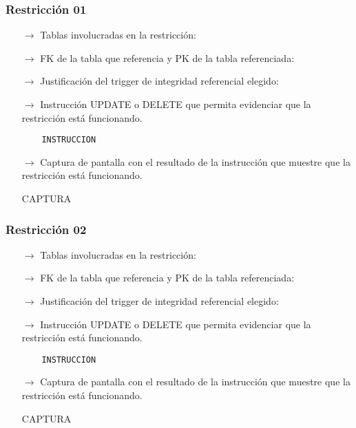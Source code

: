 \subsubsection*{Restricción 01}

\begin{itemize}
    \item[$\rightarrow$] Tablas involucradas en la restricción: 
    \item[$\rightarrow$] FK de la tabla que referencia y PK de la tabla referenciada: 
    \item[$\rightarrow$] Justificación del trigger de integridad referencial elegido: 
    \item[$\rightarrow$] Instrucción UPDATE o DELETE que permita evidenciar que la restricción está
    funcionando.
    \begin{verbatim}
    INSTRUCCION
    \end{verbatim}
    \item[$\rightarrow$] Captura de pantalla con el resultado de la instrucción que muestre que la restricción está
    funcionando.
    \begin{center}
        CAPTURA
    \end{center}
\end{itemize}

\subsubsection*{Restricción 02}

\begin{itemize}
    \item[$\rightarrow$] Tablas involucradas en la restricción: 
    \item[$\rightarrow$] FK de la tabla que referencia y PK de la tabla referenciada: 
    \item[$\rightarrow$] Justificación del trigger de integridad referencial elegido: 
    \item[$\rightarrow$] Instrucción UPDATE o DELETE que permita evidenciar que la restricción está
    funcionando.
    \begin{verbatim}
    INSTRUCCION
    \end{verbatim}
    \item[$\rightarrow$] Captura de pantalla con el resultado de la instrucción que muestre que la restricción está
    funcionando.
    \begin{center}
        CAPTURA
    \end{center}
\end{itemize}

